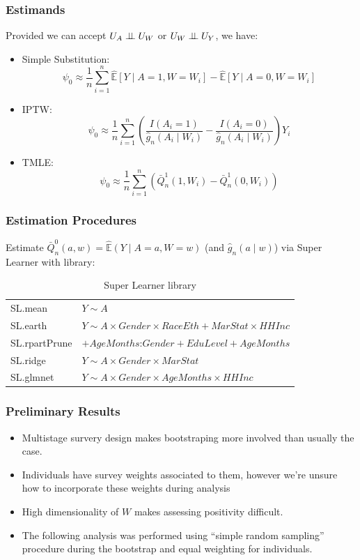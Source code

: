\documentclass{beamer}
\newcommand{\E}{\mathbb{E}}
\newcommand{\indp}{\ensuremath{\perp\hspace{-5pt}\perp}}
\DeclareMathOperator{\logit}{logit}
\begin{document}
\begin{frame}
\frametitle{Estimands}
Provided we can accept $U_A \indp U_W$ or $U_W \indp U_Y$, we have:
\begin{itemize}
  \item Simple Substitution:
    \[
      \psi_0 \approx \frac{1}{n}\sum_{i=1}^{n}\widehat{\E}\left[Y \mid A=1, W=W_i \right] - \widehat{\E}\left[Y \mid A=0, W=W_i\right]
    \]
  \item IPTW:
  \[
    \psi_{0} \approx \frac{1}{n}\sum_{i=1}^{n} \left(\frac{I(A_i=1)}{\hat{g}_n(A_i \mid W_i)} - \frac{I(A_i=0)}{\hat{g}_n(A_i \mid W_i)} \right)Y_i
  \]
  \item TMLE:
  \[
    \psi_{0} \approx \frac{1}{n}\sum_{i=1}^{n}\left( \bar{Q}_{n}^{1}(1,W_i) - \bar{Q}_{n}^{1}(0,W_i)\right)
  \]
\end{itemize}
\end{frame}

\begin{frame}
\frametitle{Estimation Procedures}
Estimate $\bar{Q}_{n}^{0}(a,w) = \widehat{\E}(Y \mid A=a, W=w)$ (and $\hat{g}_{n}(a\mid w)$) via Super Learner with library:
\begin{table}[ht!]
\begin{tabular}{ll}
SL.mean & $Y \sim A$ \\
SL.earth & $Y \sim A \times Gender \times RaceEth + MarStat \times HHInc$ \\
SL.rpartPrune & $+ AgeMonths$:$Gender + EduLevel + AgeMonths $ \\
SL.ridge & $Y \sim A \times Gender \times MarStat$ \\
SL.glmnet &  $Y \sim A \times Gender \times AgeMonths \times HHInc$ \\
\end{tabular}
\caption{Super Learner library}
\end{table}
\end{frame}

\begin{frame}
\frametitle{Preliminary Results}
\begin{itemize}
\item Multistage survery design makes bootstraping more involved than usually the case.
\item Individuals have survey weights associated to them, however we're unsure how to incorporate these weights during analysis
\item High dimensionality of $W$ makes assessing positivity difficult.
\item The following analysis was performed using ``simple random sampling'' procedure during the bootstrap and equal weighting for individuals.
\end{itemize}
\end{frame}
\end{document}
